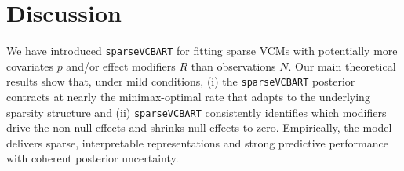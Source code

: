 \documentclass[11pt]{article}
\theoremstyle{plain}
\theoremstyle{definition}
\theoremstyle{plain}
\begin{document}




\section{Discussion}
\label{sec:discussion}
We have introduced \texttt{sparseVCBART} for fitting sparse VCMs with potentially more covariates $p$ and/or effect modifiers $R$ than observations $N.$
Our main theoretical results show that, under mild conditions, (i) the \texttt{sparseVCBART} posterior contracts at nearly the minimax-optimal rate that adapts to the underlying sparsity structure and (ii) \texttt{sparseVCBART} consistently identifies which modifiers drive the non-null effects and shrinks null effects to zero. 
Empirically, the model delivers sparse, interpretable representations and strong predictive performance with coherent posterior uncertainty.
\end{document}
